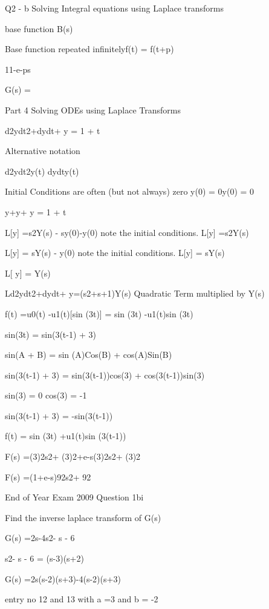 Q2 - b 
Solving Integral equations using Laplace transforms


base function B(s)

Base function repeated infinitelyf(t) = f(t+p)

11-e-ps

G(s)  = 

 
Part 4 Solving ODEs using Laplace Transforms 
 
d2ydt2+dydt+ y = 1 + t 
 
Alternative notation
 
d2ydt2y(t)				dydty(t)

Initial Conditions are often (but not always) zero	y(0) = 0y(0) = 0
 
 
y+y+ y = 1 + t
 
L[y] =s2Y(s) - sy(0)-y(0)            note the initial conditions. L[y] =s2Y(s)
 
L[y] = sY(s) - y(0)                           note the initial conditions. L[y] = sY(s) 
 
L[ y] = Y(s)
 
Ld2ydt2+dydt+ y=(s2+s+1)Y(s)	Quadratic Term multiplied by Y(s)


 


f(t) =u0(t) -u1(t)[sin (3t)] = sin (3t) -u1(t)sin (3t)

sin(3t) = sin(3(t-1) + 3)

sin(A + B) = sin (A)Cos(B) + cos(A)Sin(B) 

sin(3(t-1) + 3) = sin(3(t-1))cos(3) + cos(3(t-1))sin(3)

sin(3) = 0	           cos(3) = -1

sin(3(t-1) + 3) = -sin(3(t-1))

f(t) = sin (3t) +u1(t)sin (3(t-1))

F(s) =(3)2s2+ (3)2+e-s(3)2s2+ (3)2

F(s) =(1+e-s)92s2+ 92

End of Year Exam  2009 Question 1bi

Find the inverse laplace transform of G(s)

G(s) =2s-4s2- s - 6

s2- s - 6 = (s-3)(s+2)

G(s) =2s(s-2)(s+3)-4(s-2)(s+3)

entry no 12 and 13 with a =3 and b =  -2


